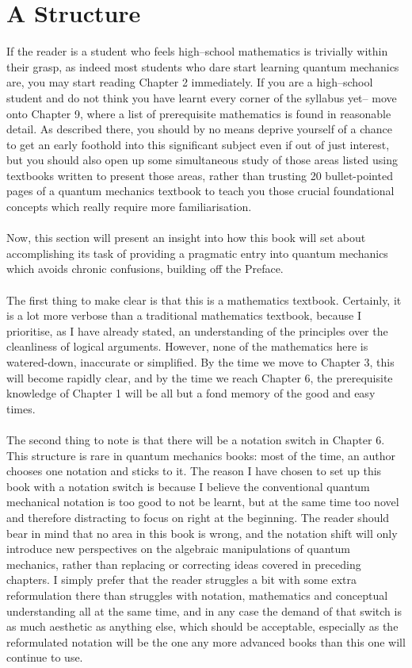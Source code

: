 \section{A Structure}
If the reader is a student who feels high--school mathematics is trivially within their grasp, as indeed most students who dare start learning quantum mechanics are, you may start reading Chapter 2 immediately. If you are a high--school student and do not think you  have learnt every corner of the syllabus yet-- move onto Chapter 9, where a list of prerequisite mathematics is found in reasonable detail. As described there, you should by no means deprive yourself of a chance to get an early foothold into this significant subject even if out of just interest, but you should also open up some simultaneous study of those areas listed using textbooks written to present those areas, rather than trusting 20 bullet-pointed pages of a quantum mechanics textbook to teach you those crucial foundational concepts which really require more familiarisation.
\\\\
Now, this section will present an insight into how this book will set about accomplishing its task of providing a pragmatic entry into quantum mechanics which avoids chronic confusions, building off the Preface. 
\\\\
The first thing to make clear is that this is a mathematics textbook. Certainly, it is a lot more verbose than a traditional mathematics textbook, because I prioritise, as I have already stated, an understanding of the principles over the cleanliness of logical arguments. However, none of the mathematics here is watered-down, inaccurate or simplified. By the time we move to Chapter 3, this will become rapidly clear, and by the time we reach Chapter 6, the prerequisite knowledge of Chapter 1 will be all but a fond memory of the good and easy times. 
\\\\
The second thing to note is that there will be a notation switch in Chapter 6. This structure is rare in quantum mechanics books: most of the time, an author chooses one notation and sticks to it. The reason I have chosen to set up this book with a notation switch is because I believe the conventional quantum mechanical notation is too good to not be learnt, but at the same time too novel and therefore distracting to focus on right at the beginning. The reader should bear in mind that no area in this book is wrong, and the notation shift will only introduce new perspectives on the algebraic manipulations of quantum mechanics, rather than replacing or correcting ideas covered in preceding chapters. I simply prefer that the reader struggles a bit with some extra reformulation there than struggles with notation, mathematics and conceptual understanding all at the same time, and in any case the demand of that switch is as much aesthetic as anything else, which should be acceptable, especially as the reformulated notation will be the one any more advanced books than this one will continue to use.
